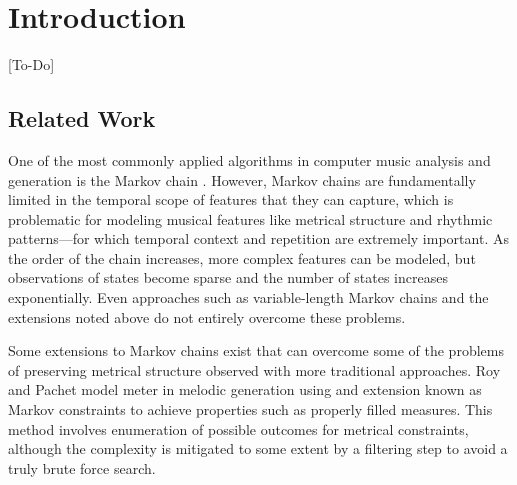 \documentclass{article}
\title{\papertitle}
\begin{document}
%
\capstartfalse
\maketitle
\capstarttrue
%
\begin{abstract}
[Will need to be tweaked at the end to reflect any additions, but the original intro seems like a good fit here at the moment]

We present an approach for generating passages of rhythm via the use of a probabilistic temporal graph grammar with rule sets that operate via recursive subdivision. This project is motivated by three factors: (1) the recognition that the literature on computer-generated rhythm is generally not as robust as those for melody and harmony; (2) my desire as a composer of avant-garde classical music to have more tools for computer-assisted composition; and (3) the hope that such an approach, having already produced compelling results for some styles of music, may provide insight into the structure of rhythms found in existing repertoires.
\end{abstract}


\section{Introduction}\label{sec:introduction}

[To-Do]

\subsection{Related Work}

One of the most commonly applied algorithms in computer music analysis and generation is the Markov chain \cite{chordia2011, gillick2009, yi, pachet}. However, Markov chains are fundamentally limited in the temporal scope of features that they can capture, which is problematic for modeling musical features like metrical structure and rhythmic patterns---for which temporal context and repetition are extremely important. As the order of the chain increases, more complex features can be modeled, but observations of states become sparse and the number of states increases exponentially. Even approaches such as variable-length Markov chains \cite{ron, buhlmann} and the extensions noted above do not entirely overcome these problems.

Some extensions to Markov chains exist that can overcome some of the problems of preserving metrical structure observed with more traditional approaches. Roy and Pachet model meter in melodic generation \cite{roy2013} using and extension known as Markov constraints \cite{pachet2011} to achieve properties such as properly filled measures. This method involves enumeration of possible outcomes for metrical constraints, although the complexity is mitigated to some extent by a filtering step to avoid a truly brute force search.
\end{document}
